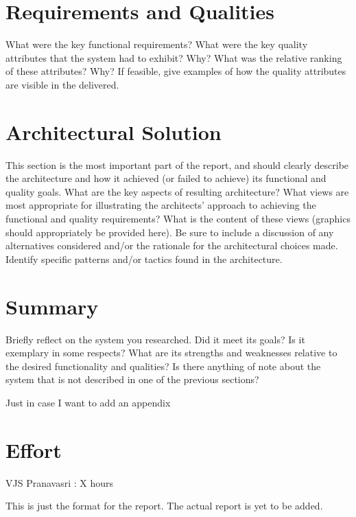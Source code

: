 \documentclass[conference, onecolumn]{IEEEtran}
\begin{document}
\section{Requirements and Qualities}
\color{blue}
What were the key functional requirements? What were the key quality attributes that the system had to exhibit? Why? What was the relative ranking of these attributes? Why? If feasible, give examples of how the quality attributes are visible in the delivered.
\color{black}

\section{Architectural Solution}
\color{blue}
This section is the most important part of the report, and should clearly describe the architecture and how it achieved (or failed to achieve) its functional and quality goals.
What are the key aspects of resulting architecture? What views are most appropriate for illustrating the architects' approach to achieving the functional and quality requirements? What is the content of these views (graphics should appropriately be provided here). Be sure to include a discussion of any alternatives considered and/or the rationale for the architectural choices made. Identify specific patterns and/or tactics found in the architecture.
\color{black}

\section{Summary}
\color{blue}
Briefly reflect on the system you researched. Did it meet its goals? Is it exemplary in some respects? What are its strengths and weaknesses relative to the desired functionality and qualities? Is there anything of note about the system that is not described in one of the previous sections?
\color{black}




\appendix
Just in case I want to add an appendix

\section*{Effort}
VJS Pranavasri : X hours

\vspace{12pt}
\color{red}
This is just the format for the report. The actual report is yet to be added.
\end{document}
